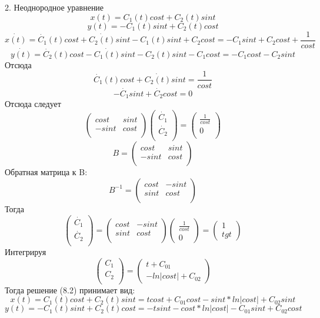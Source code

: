 \documentclass[10pt]{report}
\begin{document}
2. Неоднородное уравнение
\[x(t) =C_1(t)cost+C_2(t)sint\]
\[y(t)=-C_1(t)sint+C_2(t)cost\]
\[\dot{x(t)} =\dot{C_1}(t)cost+\dot{C_2(t)}sint-C_1(t)sint+C_2cost=-C_1sint+C_2cost+\frac 1 {cost}\]
\[\dot{y(t)}=\dot{C_2}(t)cost-\dot{C_1(t)}sint-C_2(t)sint-C_1cost=-C_1cost-C_2sint\]
Отсюда
\[\dot{C_1}(t)cost+\dot{C_2(t)}sint= \frac 1 {cost}\]
\[-\dot{C_1}sint+\dot{C_2}cost=0\]
Отсюда следует
\begin{equation}
\left(
\begin{array}{cc}
cost & sint\\
-sint & cost\\
\end{array}
\right)
\left(
\begin{array}{c}
\dot{C_1}\\
\dot{C_2}\\
\end{array}
\right)=
\left(
\begin{array}{c}
\frac 1 {cost}\\
0\\
\end{array}
\right)
\end{equation}
\[B=\left(
\begin{array}{cc}
cost & sint\\
-sint & cost\\
\end{array}
\right)\]
Обратная матрица к B:
\[B^{-1}=\left(
\begin{array}{cc}
cost & -sint\\
sint & cost\\
\end{array}
\right)\]
Тогда
\[
\left(
\begin{array}{c}
\dot{C_1}\\
\dot{C_2}\\
\end{array}
\right)=
\left(
\begin{array}{cc}
cost & -sint\\
sint & cost\\
\end{array}
\right)
\left(
\begin{array}{c}
\frac 1 {cost}\\
0
\end{array}
\right)=
\left(
\begin{array}{c}
1\\
tgt
\end{array}
\right)
\]
Интегрируя
\[
\left(
\begin{array}{c}
C_1\\
C_2\\
\end{array}
\right)=
\left(
\begin{array}{c}
t+C_{01}\\
-ln|cost|+C_{02}
\end{array}
\right)
\]
Тогда решение (8.2) принимает вид:
\[x(t) =C_1(t)cost+C_2(t)sint=tcost+C_{01}cost-sint*ln|cost|+C_{02}sint\]
\[y(t) =-C_1(t)sint+C_2(t)cost=-tsint-cost*ln|cost|-C_{01}sint+C_{02}cost\]
\end{document}
